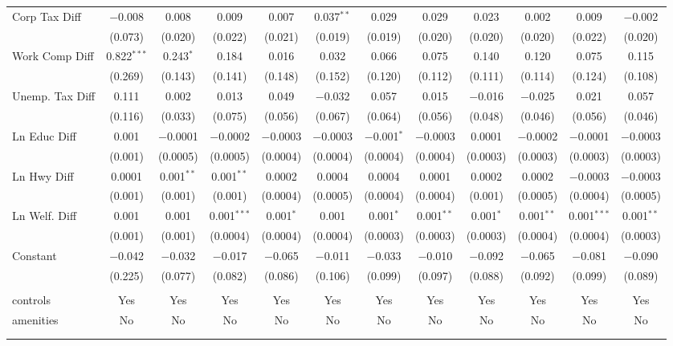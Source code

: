 \begin{table}[!htbp]
\begin{tabular}{@{\extracolsep{5pt}}lccccccccccc}
  Corp Tax Diff & $-$0.008 & 0.008 & 0.009 & 0.007 & 0.037$^{**}$ & 0.029 & 0.029 & 0.023 & 0.002 & 0.009 & $-$0.002 \\ 
  & (0.073) & (0.020) & (0.022) & (0.021) & (0.019) & (0.019) & (0.020) & (0.020) & (0.020) & (0.022) & (0.020) \\ 
  Work Comp Diff & 0.822$^{***}$ & 0.243$^{*}$ & 0.184 & 0.016 & 0.032 & 0.066 & 0.075 & 0.140 & 0.120 & 0.075 & 0.115 \\ 
  & (0.269) & (0.143) & (0.141) & (0.148) & (0.152) & (0.120) & (0.112) & (0.111) & (0.114) & (0.124) & (0.108) \\ 
  Unemp. Tax Diff & 0.111 & 0.002 & 0.013 & 0.049 & $-$0.032 & 0.057 & 0.015 & $-$0.016 & $-$0.025 & 0.021 & 0.057 \\ 
  & (0.116) & (0.033) & (0.075) & (0.056) & (0.067) & (0.064) & (0.056) & (0.048) & (0.046) & (0.056) & (0.046) \\ 
  Ln Educ Diff & 0.001 & $-$0.0001 & $-$0.0002 & $-$0.0003 & $-$0.0003 & $-$0.001$^{*}$ & $-$0.0003 & 0.0001 & $-$0.0002 & $-$0.0001 & $-$0.0003 \\ 
  & (0.001) & (0.0005) & (0.0005) & (0.0004) & (0.0004) & (0.0004) & (0.0004) & (0.0003) & (0.0003) & (0.0003) & (0.0003) \\ 
  Ln Hwy Diff & 0.0001 & 0.001$^{**}$ & 0.001$^{**}$ & 0.0002 & 0.0004 & 0.0004 & 0.0001 & 0.0002 & 0.0002 & $-$0.0003 & $-$0.0003 \\ 
  & (0.001) & (0.001) & (0.001) & (0.0004) & (0.0005) & (0.0004) & (0.0004) & (0.001) & (0.0005) & (0.0004) & (0.0005) \\ 
  Ln Welf. Diff & 0.001 & 0.001 & 0.001$^{***}$ & 0.001$^{*}$ & 0.001 & 0.001$^{*}$ & 0.001$^{**}$ & 0.001$^{*}$ & 0.001$^{**}$ & 0.001$^{***}$ & 0.001$^{**}$ \\ 
  & (0.001) & (0.001) & (0.0004) & (0.0004) & (0.0004) & (0.0003) & (0.0003) & (0.0003) & (0.0004) & (0.0004) & (0.0003) \\ 
  Constant & $-$0.042 & $-$0.032 & $-$0.017 & $-$0.065 & $-$0.011 & $-$0.033 & $-$0.010 & $-$0.092 & $-$0.065 & $-$0.081 & $-$0.090 \\ 
  & (0.225) & (0.077) & (0.082) & (0.086) & (0.106) & (0.099) & (0.097) & (0.088) & (0.092) & (0.099) & (0.089) \\ 
 \hline \\[-1.8ex] 
controls & Yes & Yes & Yes & Yes & Yes & Yes & Yes & Yes & Yes & Yes & Yes \\ 
amenities & No & No & No & No & No & No & No & No & No & No & No \\ 
\hline \\[-1.8ex] 
\hline 
\hline \\[-1.8ex] 
\end{tabular} 
\end{table} 
